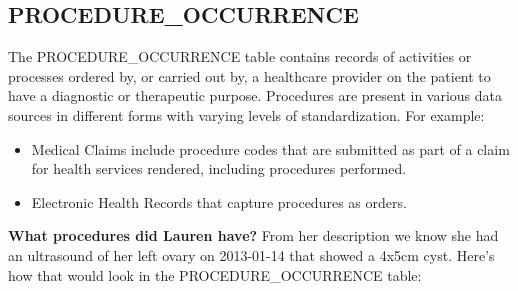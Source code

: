 \documentclass[11pt]{book}
\providecommand{\tightlist}{%
  \setlength{\itemsep}{0pt}\setlength{\parskip}{0pt}}
\theoremstyle{definition}
\theoremstyle{definition}
\theoremstyle{definition}
\theoremstyle{remark}
\begin{document}
\hypertarget{procedureOccurrence}{%
\subsection{PROCEDURE\_OCCURRENCE}\label{procedureOccurrence}}

The PROCEDURE\_OCCURRENCE table contains records of activities or processes ordered by, or carried out by, a healthcare provider on the patient to have a diagnostic or therapeutic purpose. Procedures are present in various data sources in different forms with varying levels of standardization. For example:

\begin{itemize}
\tightlist
\item
  Medical Claims include procedure codes that are submitted as part of a claim for health services rendered, including procedures performed.
\item
  Electronic Health Records that capture procedures as orders.
\end{itemize}

\textbf{What procedures did Lauren have?}
From her description we know she had an ultrasound of her left ovary on 2013-01-14 that showed a 4x5cm cyst. Here's how that would look in the PROCEDURE\_OCCURRENCE table:
\end{document}
